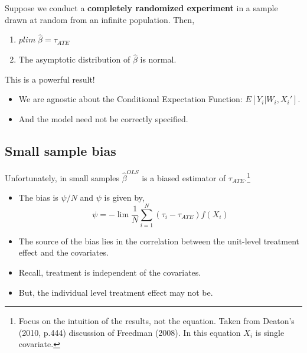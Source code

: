 \documentclass[
  letterpaper,
  DIV=11,
  numbers=noendperiod]{scrreprt}
\providecommand{\tightlist}{%
  \setlength{\itemsep}{0pt}\setlength{\parskip}{0pt}}\usepackage{longtable,booktabs,array}
\theoremstyle{definition}
\theoremstyle{remark}
\begin{document}
\begin{tcolorbox}[enhanced jigsaw, breakable, colframe=quarto-callout-important-color-frame, toptitle=1mm, toprule=.15mm, opacitybacktitle=0.6, opacityback=0, rightrule=.15mm, titlerule=0mm, colback=white, bottomtitle=1mm, title={Theorem (Imbens and Rubin, 2015, p.123)}, arc=.35mm, coltitle=black, colbacktitle=quarto-callout-important-color!10!white, leftrule=.75mm, bottomrule=.15mm, left=2mm]

Suppose we conduct a \textbf{completely randomized experiment} in a
sample drawn at random from an infinite population. Then,

\par

\begin{enumerate}
\def\labelenumi{\arabic{enumi}.}
\tightlist
\item
  \(plim\;\hat{\beta}=\tau_{ATE}\)
\item
  The asymptotic distribution of \(\hat{\beta}\) is normal.
\end{enumerate}

\end{tcolorbox}

This is a powerful result!

\par

\begin{itemize}
\tightlist
\item
  We are agnostic about the Conditional Expectation Function:
  \(E[Y_i|W_i,X_i']\).
\item
  And the model need not be correctly specified.
\end{itemize}

\hypertarget{small-sample-bias}{%
\subsection{Small sample bias}\label{small-sample-bias}}

Unfortunately, in small samples \(\hat{\beta}^{OLS}\) is a biased
estimator of \(\tau_{ATE}\).\footnote{Focus on the intuition of the
  results, not the equation. Taken from Deaton's (2010, p.444)
  discussion of Freedman (2008). In this equation \(X_i\) is single
  covariate.}

\begin{itemize}
\tightlist
\item
  The bias is \(\psi/N\) and \(\psi\) is given by, \[
              \psi = -\lim \frac{1}{N}\sum_{i=1}^N (\tau_i-\tau_{ATE})f(X_i)
  \]
\item
  The source of the bias lies in the correlation between the unit-level
  treatment effect and the covariates.
\item
  Recall, treatment is independent of the covariates.
\item
  But, the individual level treatment effect may not be.
\end{itemize}
\end{document}
